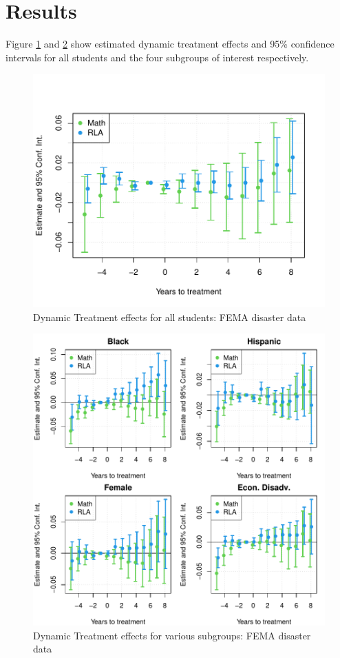 \section{Results} \label{Results}

Figure \ref{ResultsPlot} and \ref{ResultsPlotSub} show estimated dynamic treatment effects and 95\% confidence intervals for all students and the four subgroups of interest respectively. 

\begin{figure}[!h]
	\centering
	\includegraphics[scale=1]{"../Code & Data/ResultsPlot.pdf"}
	\caption{Dynamic Treatment effects for all students: FEMA disaster data}
	\label{ResultsPlot}
\end{figure}

\begin{figure}[!h]
	\centering
	\includegraphics[scale=1]{"../Code & Data/ResultsPlotSub.pdf"}
	\caption{Dynamic Treatment effects for various subgroups: FEMA disaster data}
	\label{ResultsPlotSub}
\end{figure}


